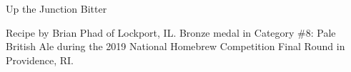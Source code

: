 \begin{recipe}{Up the Junction Bitter}

\begin{aboutblock}
Recipe by Brian Phad of Lockport, IL. Bronze medal in Category \#8: Pale British Ale
during the 2019 National Homebrew Competition Final Round in Providence, RI. \sourceaha
\end{aboutblock}


\begin{methodandtiming}
 
\begin{mashsteps}
\end{mashsteps}

\begin{fermentationsteps}
\end{fermentationsteps}

\end{methodandtiming}

\recipebreak

\begin{ingredientsblock}

\begin{malts}
\end{malts}

\begin{hops}
\end{hops}


\end{ingredientsblock}

\end{recipe}

